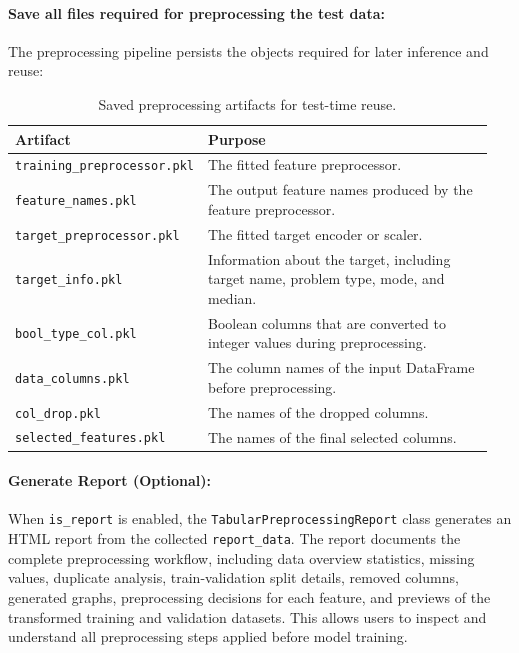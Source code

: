 \paragraph{Save all files required for preprocessing the test data:}\par
The preprocessing pipeline persists the objects required for later inference and reuse:

\begin{table}[H]
\centering
\small
\renewcommand{\arraystretch}{1.15}
\setlength{\tabcolsep}{4pt}
\caption{Saved preprocessing artifacts for test-time reuse.}
\begin{tabular}{p{0.30\linewidth}p{0.65\linewidth}}
\toprule
\textbf{Artifact} & \textbf{Purpose}\\
\midrule
\texttt{training\_preprocessor.}\newline\texttt{pkl} & The fitted feature preprocessor.\\
\texttt{feature\_names.pkl} & The output feature names produced by the feature preprocessor.\\
\texttt{target\_preprocessor.}\newline\texttt{pkl} & The fitted target encoder or scaler.\\
\texttt{target\_info.pkl} & Information about the target, including target name, problem type, mode, and median.\\
\texttt{bool\_type\_col.pkl} & Boolean columns that are converted to integer values during preprocessing.\\
\texttt{data\_columns.pkl} & The column names of the input DataFrame before preprocessing.\\
\texttt{col\_drop.pkl} & The names of the dropped columns.\\
\texttt{selected\_features.pkl} & The names of the final selected columns.\\
\bottomrule
\end{tabular}
\end{table}
\vspace{2cm}
\paragraph{Generate Report (Optional):}\par
When \texttt{is\_report} is enabled, the \texttt{TabularPreprocessingReport} class generates an HTML report from the collected \texttt{report\_data}. The report documents the complete preprocessing workflow, including data overview statistics, missing values, duplicate analysis, train-validation split details, removed columns, generated graphs, preprocessing decisions for each feature, and previews of the transformed training and validation datasets. This allows users to inspect and understand all preprocessing steps applied before model training.
\vspace{1cm}
